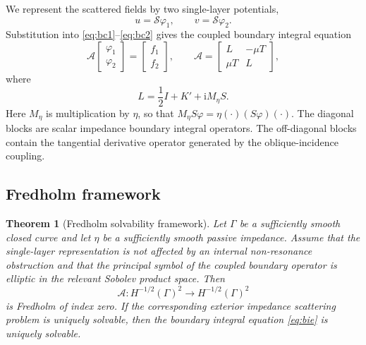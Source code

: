 \documentclass[11pt]{article}
\numberwithin{equation}{section}
\newtheorem{theorem}{Theorem}[section]
\newcommand{\ii}{\mathrm{i}}
\begin{document}
We represent the scattered fields by two single-layer potentials,
\begin{equation}
u=\mathcal S\varphi_1,\qquad v=\mathcal S\varphi_2.
\end{equation}
Substitution into \eqref{eq:bc1}--\eqref{eq:bc2} gives the coupled boundary integral equation
\begin{equation}
\mathcal A
\begin{bmatrix}\varphi_1\\ \varphi_2\end{bmatrix}
=
\begin{bmatrix}f_1\\ f_2\end{bmatrix},
\qquad
\mathcal A=
\begin{bmatrix}
L&-\mu T\\
\mu T&L
\end{bmatrix},
\label{eq:bie}
\end{equation}
where
\begin{equation}
L=\frac12 I+K'+\ii M_\eta S .
\end{equation}
Here $M_\eta$ is multiplication by $\eta$, so that $M_\eta S\varphi=\eta(\cdot)(S\varphi)(\cdot)$. The diagonal blocks are scalar impedance boundary integral operators. The off-diagonal blocks contain the tangential derivative operator generated by the oblique-incidence coupling.

\subsection{Fredholm framework}

\begin{theorem}[Fredholm solvability framework]
Let $\Gamma$ be a sufficiently smooth closed curve and let $\eta$ be a sufficiently smooth passive impedance. Assume that the single-layer representation is not affected by an internal non-resonance obstruction and that the principal symbol of the coupled boundary operator is elliptic in the relevant Sobolev product space. Then
\[
\mathcal A:H^{-1/2}(\Gamma)^2\to H^{-1/2}(\Gamma)^2
\]
is Fredholm of index zero. If the corresponding exterior impedance scattering problem is uniquely solvable, then the boundary integral equation \eqref{eq:bie} is uniquely solvable.
\end{theorem}
\end{document}
